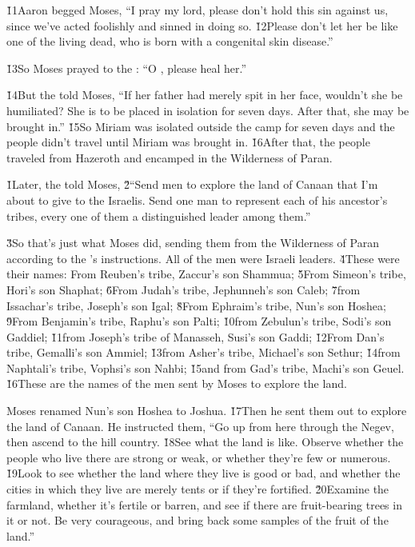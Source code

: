 \v{11}Aaron begged Moses, ``I pray my lord, please don't hold this sin against us, since we've acted foolishly and sinned in doing so. \v{12}Please don't let her be like one of the living dead, who is born with a congenital skin disease.''

\v{13}So Moses prayed to the : ``O , please heal her.''

\v{14}But the  told Moses, ``If her father had merely spit in her face, wouldn't she be humiliated? She is to be placed in isolation for seven days. After that, she may be brought in.'' \v{15}So Miriam was isolated outside the camp for seven days and the people didn't travel until Miriam was brought in. \v{16}After that, the people traveled from Hazeroth and encamped in the Wilderness of Paran.

\v{1}Later, the  told Moses, \v{2}``Send men to explore the land of Canaan that I'm about to give to the Israelis. Send one man to represent each of his ancestor's tribes, every one of them a distinguished leader among them.''

\v{3}So that's just what Moses did, sending them from the Wilderness of Paran according to the 's instructions. All of the men were Israeli leaders. \v{4}These were their names: From Reuben's tribe, Zaccur's son Shammua; \v{5}From Simeon's tribe, Hori's son Shaphat; \v{6}From Judah's tribe, Jephunneh's son Caleb; \v{7}from Issachar's tribe, Joseph's son Igal; \v{8}From Ephraim's tribe, Nun's son Hoshea; \v{9}From Benjamin's tribe, Raphu's son Palti; \v{10}from Zebulun's tribe, Sodi's son Gaddiel; \v{11}from Joseph's tribe of Manasseh, Susi's son Gaddi; \v{12}From Dan's tribe, Gemalli's son Ammiel; \v{13}from Asher's tribe, Michael's son Sethur; \v{14}from Naphtali's tribe, Vophsi's son Nahbi; \v{15}and from Gad's tribe, Machi's son Geuel. \v{16}These are the names of the men sent by Moses to explore the land.

Moses renamed Nun's son Hoshea to Joshua. \v{17}Then he sent them out to explore the land of Canaan. He instructed them, ``Go up from here through the Negev, then ascend to the hill country. \v{18}See what the land is like. Observe whether the people who live there are strong or weak, or whether they're few or numerous. \v{19}Look to see whether the land where they live is good or bad, and whether the cities in which they live are merely tents or if they're fortified. \v{20}Examine the farmland, whether it's fertile or barren, and see if there are fruit-bearing trees in it or not. Be very courageous, and bring back some samples of the fruit of the land.''

